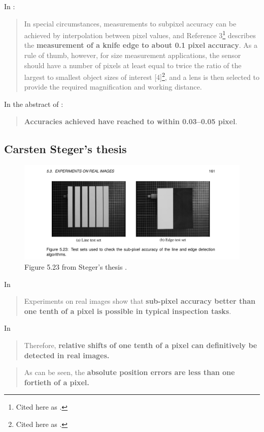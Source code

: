 \documentclass[a4paper,12pt]{article}
\begin{document}
In \cite{eren2014measurement}:
\begin{quotation}
In special circumstances, measurements to subpixel accuracy can be achieved by
interpolation between pixel values, and Reference 3\footnote{Cited here as \cite{knives}.} describes the \textbf{measurement of a knife edge to about
0.1 pixel accuracy}. As a rule of thumb, however, for size measurement applications, the sensor should
have a number of pixels at least equal to twice the ratio of the largest to smallest object sizes of interest
[4]\footnote{Cited here as \cite{hopwood1980design}.}, and a lens is then selected to provide the required magnification and working distance.
\end{quotation}

In the abstract of \cite{MIKHAIL198463}:
\begin{quotation}
\textbf{Accuracies achieved have reached to within 0.03–0.05 pixel}.
\end{quotation}

\subsection{Carsten Steger's thesis}

\begin{figure}
  \centering
  \includegraphics[width=\textwidth]{Steger_Thesis_Fig5_23}
  \caption{Figure 5.23 from Steger's thesis \cite{Steger}.}
\end{figure}

In \cite[p.1]{Steger}
\begin{quotation}
Experiments on real images
show that \textbf{sub-pixel accuracy better than one tenth of a pixel is possible in typical inspection
tasks}.
\end{quotation}

In \cite[Section 5.3.2
Sub-Pixel Accuracy of Line Position and Width, p.164]{Steger}
\begin{quotation}
Therefore, \textbf{relative shifts of one tenth of a pixel can definitively be detected
in real images.}
\end{quotation}
\begin{quotation}
As can be seen, the \textbf{absolute position errors are less than
one fortieth of a pixel.}
\end{quotation}
\end{document}
